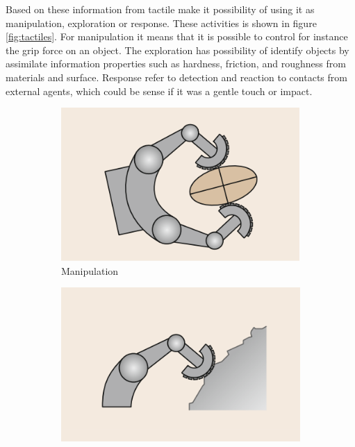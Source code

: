 \documentclass[USenglish]{ifimaster}  %
\begin{document}
Based on these information from tactile make it possibility of using it as manipulation, exploration or response. These activities is shown in figure \ref{fig:tactiles}. For manipulation it means that it is possible to control for instance the grip force on an object. The exploration has possibility of identify objects by assimilate information properties such as hardness, friction, and roughness from materials and surface. Response refer to detection and reaction to contacts from external agents, which could be sense if it was a gentle touch or impact.  


	\begin{figure}
	\centering
	\begin{subfigure}[b]{0.32\textwidth}
		\centering
		\includegraphics[width=\linewidth]{Figures/tactiles1}
		\caption{Manipulation}
		\label{fig:tact1}
	\end{subfigure}\hfill
	\begin{subfigure}[b]{0.32\textwidth}
		\centering
		\includegraphics[width=\linewidth]{Figures/tactiles2}

\end{subfigure}
\end{figure}
\end{document}
